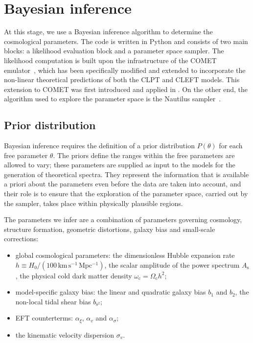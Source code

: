 \documentclass[12pt,a4paper,oneside]{report}
\begin{document}
\section{Bayesian inference}\label{sec:BayesianInference}
At this stage, we use a Bayesian inference algorithm to determine the cosmological parameters. The code is written in Python and consists of two main blocks: a likelihood evaluation block and a parameter space sampler. The likelihood computation is built upon the infrastructure of the COMET emulator~\cite{CometRef}, which has been specifically modified and extended to incorporate the non-linear theoretical predictions of both the CLPT and CLEFT models. This extension to COMET was first introduced and applied in \cite{MartinK}. On the other end, the algorithm used to explore the parameter space is the Nautilus sampler~\cite{Nautilus}.

\subsection{Prior distribution}\label{subsec:Prior}
Bayesian inference requires the definition of a prior distribution $P(\theta)$ for each free parameter $\theta$. The priors define the ranges within the free parameters are allowed to vary; these parameters are supplied as input to the models for the generation of theoretical spectra. They represent the information that is available a priori about the parameters even before the data are taken into account, and their role is to ensure that the exploration of the parameter space, carried out by the sampler, takes place within physically plausible regions.

The parameters we infer are a combination of parameters governing cosmology, structure formation, geometric distortions, galaxy bias and small-scale corrections:
\begin{itemize}
  \item global cosmological parameters: the dimensionless Hubble expansion rate $h \equiv H_0 / (100 \, \mathrm{km \, s^{-1} \, Mpc^{-1}})$, the scalar amplitude of the power spectrum $A_\mathrm{s}$, the physical cold dark matter density $\omega_\mathrm{c} = \Omega_\mathrm{c} h^2$;
  \item model-specific galaxy bias: the linear and quadratic galaxy bias $b_1$ and $b_2$, the non-local tidal shear bias $b_{\mathrm{s}^2}$;
  \item EFT counterterms: $\alpha_\xi$, $\alpha_v$ and $\alpha_\sigma$;
  \item the kinematic velocity dispersion $\sigma_v$.
\end{itemize}
\end{document}
